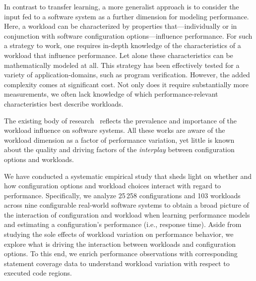 In contrast to transfer learning, a more generalist approach is to consider the input fed to a software system as a further dimension for modeling performance. Here, a workload can be characterized by properties that---individually or in conjunction with software configuration options---influence performance. For such a strategy to work, one requires in-depth knowledge of the characteristics of a workload that influence performance. Let alone these characteristics can be mathematically modeled at all. This strategy has been effectively tested for a  variety of application-domains, such as program verification. However, the added complexity comes at significant cost. 
Not only does it require substantially more measurements, we often lack knowledge of which performance-relevant characteristics best describe workloads.


The existing body of research~\cite{dorn2020,siegmundPerformanceinfluenceModelsHighly2015,haDeepPerf2019,perfAL,guoVariabilityawarePerformancePrediction2013,sarkarCostEfficientSamplingPerformance,guo_2018_data,fourier_learning_2015,perLasso,chen_hinnperf_2022,chen_mmo_2021,nairUsingBadLearners2017,nairFlash18,ohFindingNearoptimalConfigurations2017} reflects the prevalence and importance of the workload influence on software systems. All these works are aware of the workload dimension as a factor of performance variation, yet little is known about the quality and driving factors of the \emph{interplay} between configuration options and workloads. 

We have conducted a systematic empirical study that sheds light on whether and how configuration options and workload choices interact with regard to performance. 
Specifically, we analyze 25\,258 configurations and 103 workloads across nine configurable real-world software systems to obtain a broad picture of the interaction of configuration and workload when learning performance models and estimating a configuration's performance (i.e., response time). Aside from studying the sole effects of workload variation on performance behavior, we explore what is driving the interaction between workloads and configuration options. To this end, we enrich performance observations with corresponding statement coverage data to understand workload variation with respect to executed code regions.

